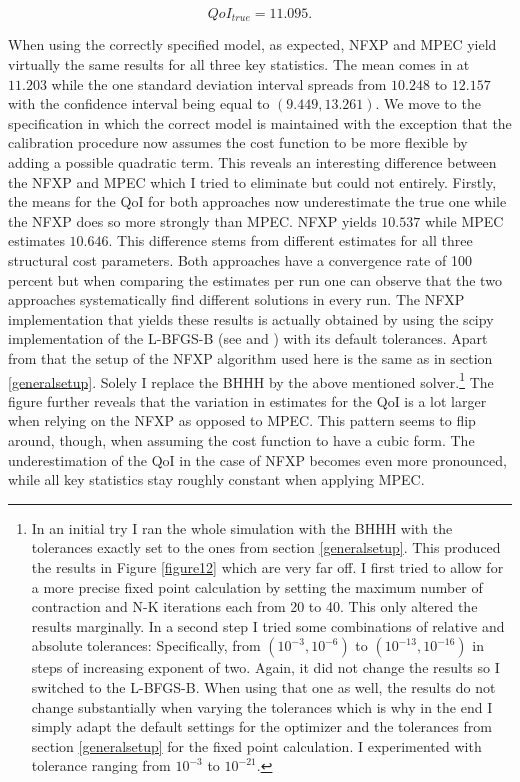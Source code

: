 \begin{equation*}
	QoI_{true} = 11.095.
\end{equation*}

When using the correctly specified model, as expected, NFXP and MPEC yield virtually the same results for all three key statistics. The mean comes in at $11.203$ while the one standard deviation interval spreads from $10.248$ to $12.157$ with the confidence interval being equal to $(9.449, 13.261)$. We move to the specification in which the correct model is maintained with the exception that the calibration procedure now assumes the cost function to be more flexible by adding a possible quadratic term. This reveals an interesting difference between the NFXP and MPEC which I tried to eliminate but could not entirely. Firstly, the means for the QoI for both approaches now underestimate the true one while the NFXP does so more strongly than MPEC. NFXP yields $10.537$ while MPEC estimates $10.646$. This difference stems from different estimates for all three structural cost parameters. Both approaches have a convergence rate of 100 percent but when comparing the estimates per run one can observe that the two approaches systematically find different solutions in every run. The NFXP implementation that yields these results is actually obtained by using the scipy implementation of the L-BFGS-B (see \cite{Byrd.1997} and \cite{scipy.2020}) with its default tolerances. Apart from that the setup of the NFXP algorithm used here is the same as in section \ref{generalsetup}. Solely I replace the BHHH by the above mentioned solver.\footnote{In an initial try I ran the whole simulation with the BHHH with the tolerances exactly set to the ones from section \ref{generalsetup}. This produced the results in Figure \ref{figure12} which are very far off. I first tried to allow for a more precise fixed point calculation by setting the maximum number of contraction and N-K iterations each from 20 to 40. This only altered the results marginally. In a second step I tried some combinations of relative and absolute tolerances: Specifically, from $(10^{-3}, 10^{-6})$ to $(10^{-13}, 10^{-16})$ in steps of increasing exponent of two. Again, it did not change the results so I switched to the L-BFGS-B. When using that one as well, the results do not change substantially when varying the tolerances which is why in the end I simply adapt the default settings for the optimizer and the tolerances from section \ref{generalsetup} for the fixed point calculation. I experimented with tolerance ranging from $10^{-3}$ to $10^{-21}$.} The figure further reveals that the variation in estimates for the QoI is a lot larger when relying on the NFXP as opposed to MPEC. This pattern seems to flip around, though, when assuming the cost function to have a cubic form. The underestimation of the QoI in the case of NFXP becomes even more pronounced, while all key statistics stay roughly constant when applying MPEC.

